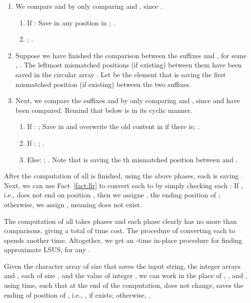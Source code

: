 \documentclass[11pt]{llncs}
\begin{document}
\begin{enumerate}
\item We compare  and  by only comparing 
 and , since .
\begin{enumerate}
\item If :
Save  in any position in ;
.

\item 
;
.

\end{enumerate} 

\item 
  Suppose we have finished the comparison between the suffixes
   and , for some , .
  The leftmost  mismatched positions (if existing) between them
  have been saved in the circular array . Let 
  be the element that 
  is saving the first mismatched position (if existing) between the two
  suffixes. 

\item  Next, we compare the suffixes  and  by
  only comparing  and , since  and
   have been compared. Remind that 
  below is in its cyclic manner.

  \begin{enumerate}
  \item If : ;  Save 
    in  and overwrite the old content in  if
    there is; .

  \item If : 
    ;
    .
  \item Else:
    ;
    .
    Note that  is saving the th
    mismatched position between  and .
\end{enumerate}

\end{enumerate}


After the computation of all  is finished, using the above 
 phases, each  is saving .
Next,
we can use Fact~\ref{fact:llr} to convert each  to
 by simply checking each : If , i.e.,
 does not end on position , then we assigne , the ending position of ; otherwise, we assign
, meaning  does not exist.

\medskip 

The computation 
of all  takes
  phases and each phase clearly has no more
than  comparisons, giving a total of  time cost. 
The procedure of converting each  to  spends
another  time. Altogether, we get an -time in-place
procedure for finding approximate LSUS, for any .

\begin{lemma}
\label{lem:lsus-k}
  Given the character array  of  size  that saves the input string, 
  the integer arrays  and , each of size , and the value
  of integer , we can work
  in the place of , , and , using  time, such that at
  the end of the computation,  does not change,  saves the
  ending of position of ,
i.e., ,
 if  exists; otherwise,
  .
\end{lemma}
\end{document}
